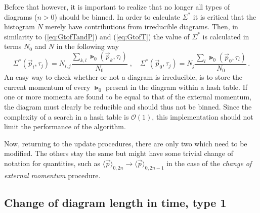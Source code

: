 Before that however, it is important to realize that no longer all types of diagrams ($ n > 0 $) should be binned. In order to calculate $ \Sigma^* $ it is critical that the histogram $ N $ merely have contributions from irreducible diagrams. Then, in similarity to (\ref{eq:GtofTandP}) and (\ref{eq:GtofT}) the value of $ \Sigma^* $ is calculated in terms $ N_0 $ and $ N $ in the following way
\begin{equation}
	\Sigma^* (\vec p_i, \tau_j) = N_{i,j} \frac{\sum_{k,l} \Gt_0 (\vec p_k, \tau_l)}{N_0}
	\; , \quad
	\Sigma^* (\vec p_0, \tau_j) = N_{j} \frac{\sum_{l} \Gt_0 (\vec p_0, \tau_l)}{N_0} \,.
\end{equation}
An easy way to check whether or not a diagram is irreducible, is to store the current momentum of every $ \Gt_0 $ present in the diagram within a hash table. If one or more momenta are found to be equal to that of the external momentum, the diagram must clearly be reducible and should thus not be binned. Since the complexity of a search in a hash table is $ \mathcal{O}(1) $, this implementation should not limit the performance of the algorithm.

Now, returning to the update procedures, there are only two which need to be modified. The others stay the same but might have some trivial change of notation for quantities, such as $ \langle \vec p \rangle_{0,2n} \rightarrow \langle \vec p \rangle_{0, 2n-1} $ in the case of the \textit{change of external momentum} procedure.

\subsection*{Change of diagram length in time, type 1}

